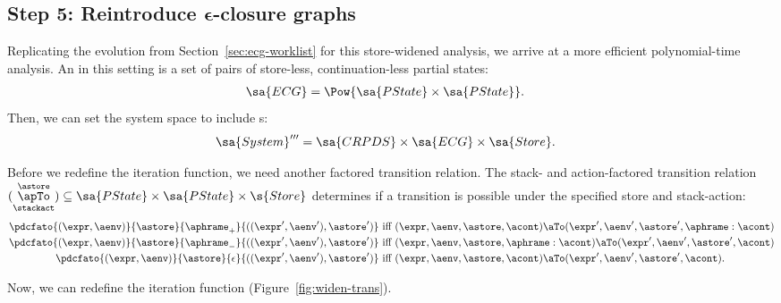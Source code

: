 \subsection{Step 5: Reintroduce 
  $\boldsymbol\epsilon$-closure graphs}\label{sec:pdcfa-eps}
Replicating the evolution from Section~\ref{sec:ecg-worklist} for this
store-widened analysis, we arrive at a more efficient polynomial-time
analysis.
An \ecg{} in this setting is a set of pairs of store-less,
continuation-less partial states:
\begin{align*}
  \sa{ECG} &= \Pow{\sa{PState} \times \sa{PState}}
  \text.
\end{align*}
Then, we can set the system space to include \ecg s:
\begin{align*}
  \sa{System}''' &= \sa{CRPDS} \times \sa{ECG} \times \sa{Store}\text.
\end{align*}

Before we redefine the iteration function, we need another factored
transition relation.
The stack- and action-factored transition relation
$(\overset{\astore}{\underset{\stackact}{\apTo}}) \subseteq \sa{PState} \times
\sa{PState} \times \s{Store}$ determines if a transition is possible
under the specified store and stack-action:
\begin{align*}
  \pdcfato{(\expr,\aenv)}{\astore}{\aphrame_+}{((\expr',\aenv'),\astore')}
  & \text{ iff }
  (\expr,\aenv,\astore,\acont) 
  \aTo
  (\expr',\aenv',\astore',\aphrame : \acont)
  \\
  \pdcfato{(\expr,\aenv)}{\astore}{\aphrame_-}{((\expr',\aenv'),\astore')}
  & \text{ iff }
  (\expr,\aenv,\astore,\aphrame : \acont) 
  \aTo
  (\expr',\aenv',\astore', \acont)
  \\
  \pdcfato{(\expr,\aenv)}{\astore}{\epsilon}{((\expr',\aenv'),\astore')}
  & \text{ iff }
  (\expr,\aenv,\astore,\acont) 
  \aTo
  (\expr',\aenv',\astore', \acont)
  \text.
\end{align*}



Now, we can redefine the iteration function (Figure~\ref{fig:widen-trans}).


